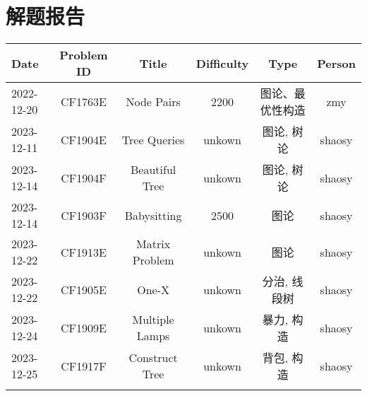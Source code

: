 \chapter{解题报告}
\begin{center}
\begin{longtable}{l c c c c c }

Date & Problem ID & Title & Difficulty & Type & Person   \\ 
\hline
2022-12-20 & CF1763E & Node Pairs & 2200 & 图论、最优性构造 & zmy  \\
2023-12-11 & CF1904E & Tree Queries & unkown & 图论, 树论 & shaosy \\
2023-12-14 & CF1904F & Beautiful Tree & unkown & 图论, 树论 & shaosy \\
2023-12-14 & CF1903F & Babysitting & 2500 & 图论 & shaosy \\
2023-12-22 & CF1913E & Matrix Problem & unkown & 图论 & shaosy \\
2023-12-22 & CF1905E & One-X & unkown & 分治, 线段树 & shaosy \\
2023-12-24 & CF1909E & Multiple Lamps & unkown & 暴力, 构造 & shaosy \\
2023-12-25 & CF1917F & Construct Tree & unkown & 背包, 构造 & shaosy \\
\hline

\label{tab:practice_index}
\end{longtable}
\end{center}

